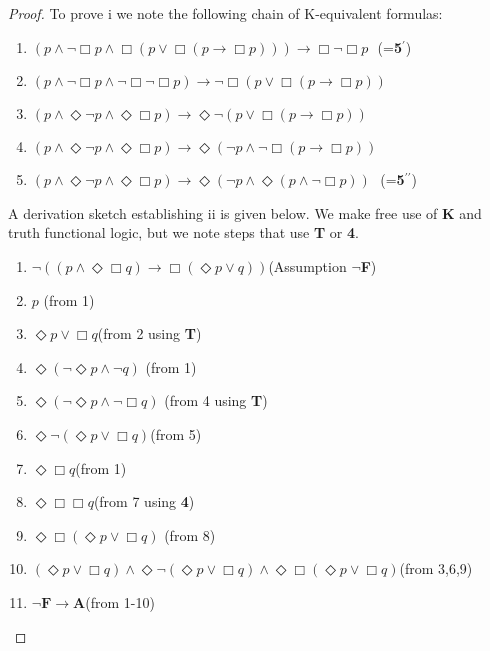 \begin{proof}
To prove i we note the following chain of K-equivalent formulas:
\begin{enumerate}
\item{$(p \wedge \neg \Box p \wedge \Box (p \vee \Box (p \rightarrow \Box p))) \rightarrow \Box \neg \Box p~~~$(=\textbf{5}$^\prime$) }
\item{$ (p \wedge \neg \Box p \wedge \neg \Box \neg \Box p) \rightarrow \neg \Box (p \vee \Box (p \rightarrow \Box p))$}
\item{$(p \wedge \Diamond\neg p \wedge \Diamond\Box p) \rightarrow \Diamond\neg (p \vee \Box (p \rightarrow \Box p))$}
\item{$(p \wedge \Diamond\neg p \wedge \Diamond\Box p) \rightarrow \Diamond(\neg p \wedge \neg \Box (p \rightarrow \Box p))$}
\item{$(p \wedge \Diamond\neg p \wedge \Diamond\Box p) \rightarrow \Diamond(\neg p \wedge \Diamond(p \wedge \neg \Box p))~~~$(=\textbf{5}$^{\prime\prime}$) }
\end{enumerate}
A derivation sketch establishing ii is given below. We make free use of \textbf{K} and truth functional logic, but we note steps that use \textbf{T} or \textbf{4}.
\begin{enumerate}
\item{$ \neg ((p\wedge \Diamond\Box q) \rightarrow \Box (\Diamond{p}\vee q))$\tab\tab\tab (Assumption $\neg $\textbf{F})}
\item{$p$ \tab\tab\tab\tab\tab(from 1)}
\item{$\Diamond{p}\vee \Box q$\tab\tab\tab\tab\tab(from 2 using \textbf{T})}
\item{$\Diamond(\neg \Diamond{p}\wedge \neg q)$ \tab\tab\tab\tab(from 1)}
\item{$\Diamond(\neg \Diamond{p}\wedge \neg \Box q)$ \tab\tab\tab\tab (from 4 using \textbf{T})}
\item{$\Diamond\neg (\Diamond{p}\vee \Box q)$\tab\tab\tab\tab (from 5)}
\item{$ \Diamond\Box q$\tab\tab\tab\tab\tab (from 1)}
\item{$ \Diamond\Box \Box q$\tab\tab\tab\tab\tab(from 7 using \textbf{4})}
\item{$\Diamond\Box (\Diamond{p}\vee \Box q)$ \tab\tab\tab\tab(from 8)}
\item{$ (\Diamond{p}\vee \Box q) \wedge \Diamond\neg (\Diamond{p}\vee \Box q)\wedge \Diamond\Box (\Diamond{p}\vee \Box q)$\tab(from 3,6,9)}
\item{$\neg \textbf{F} \rightarrow \textbf{A}$\tab\tab\tab\tab\tab(from 1-10)}

\end{enumerate}
\end{proof}
